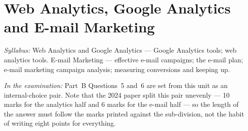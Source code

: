 \chapter{Web Analytics, Google Analytics and E-mail Marketing}

\textit{Syllabus:} Web Analytics and Google Analytics --- Google Analytics
tools; web analytics tools. E-mail Marketing --- effective e-mail campaigns; the
e-mail plan; e-mail marketing campaign analysis; measuring conversions and
keeping up.

\textit{In the examination:} Part~B Questions~5 and~6 are set from this unit as
an internal-choice pair. Note that the 2024 paper split this pair unevenly ---
10 marks for the analytics half and 6 marks for the e-mail half --- so the
length of the answer must follow the marks printed against the sub-division,
not the habit of writing eight points for everything.

\parta

